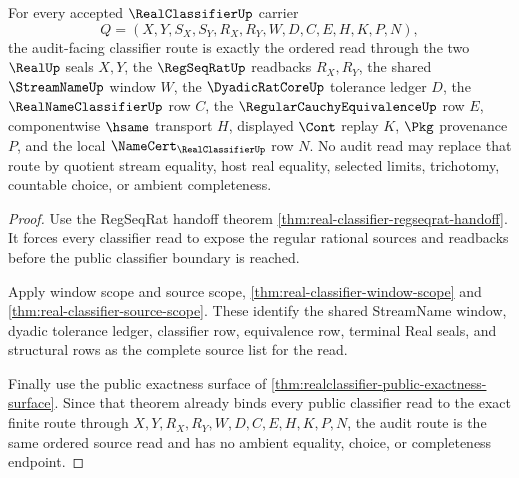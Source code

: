 \begin{theorem}
\label{thm:real-classifier-audit-route}
For every accepted $\RealClassifierUp$ carrier
$$
Q=(X,Y,S_X,S_Y,R_X,R_Y,W,D,C,E,H,K,P,N),
$$
the audit-facing classifier route is exactly the ordered read through the two $\RealUp$ seals $X,Y$, the $\RegSeqRatUp$ readbacks $R_X,R_Y$, the shared $\StreamNameUp$ window $W$, the $\DyadicRatCoreUp$ tolerance ledger $D$, the $\RealNameClassifierUp$ row $C$, the $\RegularCauchyEquivalenceUp$ row $E$, componentwise $\hsame$ transport $H$, displayed $\Cont$ replay $K$, $\Pkg$ provenance $P$, and the local $\NameCert_{\RealClassifierUp}$ row $N$. No audit read may replace that route by quotient stream equality, host real equality, selected limits, trichotomy, countable choice, or ambient completeness.
\end{theorem}
\begin{proof}
Use the RegSeqRat handoff theorem \autoref{thm:real-classifier-regseqrat-handoff}. It forces every classifier read to expose the regular rational sources and readbacks before the public classifier boundary is reached.

Apply window scope and source scope, \autoref{thm:real-classifier-window-scope} and \autoref{thm:real-classifier-source-scope}. These identify the shared StreamName window, dyadic tolerance ledger, classifier row, equivalence row, terminal Real seals, and structural rows as the complete source list for the read.

Finally use the public exactness surface of \autoref{thm:realclassifier-public-exactness-surface}. Since that theorem already binds every public classifier read to the exact finite route through $X,Y,R_X,R_Y,W,D,C,E,H,K,P,N$, the audit route is the same ordered source read and has no ambient equality, choice, or completeness endpoint.
\end{proof}

